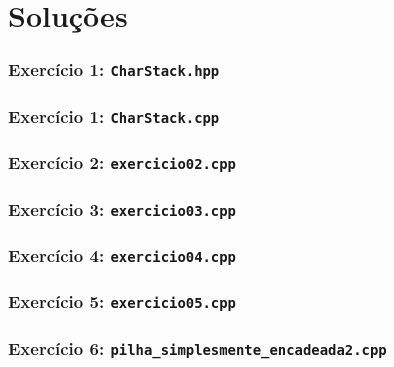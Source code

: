 \documentclass[aspectratio=169]{beamer}
\begin{document}
\section{Soluções}

\begin{frame}[fragile]\frametitle{Exercício 1: \texttt{CharStack.hpp}}

\end{frame}

\begin{frame}[fragile]\frametitle{Exercício 1: \texttt{CharStack.cpp}}
\fontsize{5pt}{5pt}\selectfont{

}
\end{frame}

\begin{frame}[fragile]\frametitle{Exercício 2: \texttt{exercicio02.cpp}}

\end{frame}

\begin{frame}[fragile]\frametitle{Exercício 3: \texttt{exercicio03.cpp}}

\end{frame}

\begin{frame}[fragile]\frametitle{Exercício 4: \texttt{exercicio04.cpp}}
\fontsize{5pt}{5pt}\selectfont{

}
\end{frame}

\begin{frame}[fragile]\frametitle{Exercício 5: \texttt{exercicio05.cpp}}

\end{frame}

\begin{frame}[fragile]\frametitle{Exercício 6: \texttt{pilha\_simplesmente\_encadeada2.cpp}}
\fontsize{6pt}{6pt}\selectfont{

}
\end{frame}
\end{document}
